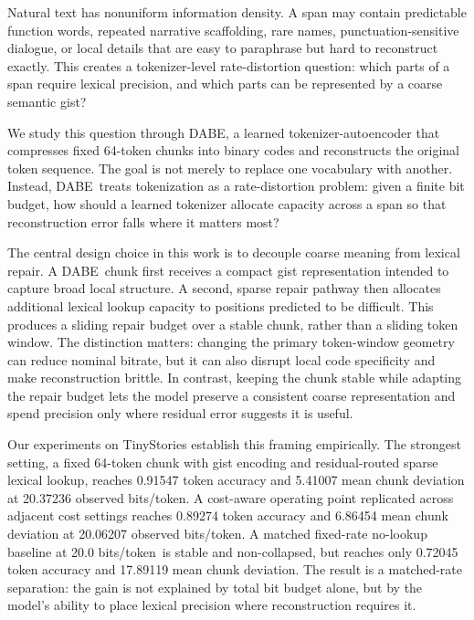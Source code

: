 \documentclass[11pt]{article}
\newcommand{\dabe}{\textsc{DABE}}
\newcommand{\bitsper}{bits/token}
\begin{document}
Natural text has nonuniform information density. A span may contain predictable function words, repeated narrative scaffolding, rare names, punctuation-sensitive dialogue, or local details that are easy to paraphrase but hard to reconstruct exactly. This creates a tokenizer-level rate-distortion question: which parts of a span require lexical precision, and which parts can be represented by a coarse semantic gist?

We study this question through \dabe, a learned tokenizer-autoencoder that compresses fixed 64-token chunks into binary codes and reconstructs the original token sequence. The goal is not merely to replace one vocabulary with another. Instead, \dabe\ treats tokenization as a rate-distortion problem: given a finite bit budget, how should a learned tokenizer allocate capacity across a span so that reconstruction error falls where it matters most?

The central design choice in this work is to decouple coarse meaning from lexical repair. A \dabe\ chunk first receives a compact gist representation intended to capture broad local structure. A second, sparse repair pathway then allocates additional lexical lookup capacity to positions predicted to be difficult. This produces a sliding repair budget over a stable chunk, rather than a sliding token window. The distinction matters: changing the primary token-window geometry can reduce nominal bitrate, but it can also disrupt local code specificity and make reconstruction brittle. In contrast, keeping the chunk stable while adapting the repair budget lets the model preserve a consistent coarse representation and spend precision only where residual error suggests it is useful.

Our experiments on TinyStories establish this framing empirically. The strongest setting, a fixed 64-token chunk with gist encoding and residual-routed sparse lexical lookup, reaches 0.91547 token accuracy and 5.41007 mean chunk deviation at 20.37236 observed \bitsper. A cost-aware operating point replicated across adjacent cost settings reaches 0.89274 token accuracy and 6.86454 mean chunk deviation at 20.06207 observed \bitsper. A matched fixed-rate no-lookup baseline at 20.0 \bitsper\ is stable and non-collapsed, but reaches only 0.72045 token accuracy and 17.89119 mean chunk deviation. The result is a matched-rate separation: the gain is not explained by total bit budget alone, but by the model's ability to place lexical precision where reconstruction requires it.
\end{document}

